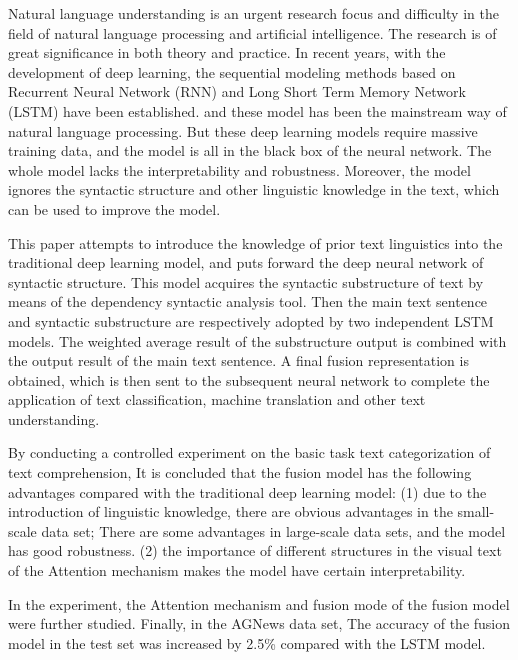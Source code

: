 \documentclass[bachelor,winfonts]{jnuthesis}
\begin{document}
\begin{englishabstract}
Natural language understanding is an urgent research focus and difficulty in the field of natural language processing and artificial intelligence.
The research is of great significance in both theory and practice.
In recent years, with the development of deep learning, the sequential modeling methods based on Recurrent Neural Network (RNN) and Long Short Term Memory Network (LSTM) have been established.
and these model has been the  mainstream way of natural language processing.
But these deep learning models require massive training data, and the model is all in the black box of the neural network.
The whole model lacks the interpretability and robustness.
Moreover, the model ignores the syntactic structure and other linguistic knowledge in the text, which can be used to improve the model.

This paper attempts to introduce the knowledge of prior text linguistics into the traditional deep learning model, and puts forward the deep neural network of syntactic structure.
This model acquires the syntactic substructure of text by means of the dependency syntactic analysis tool.
Then the main text sentence and syntactic substructure are respectively adopted by two independent LSTM models.
The weighted average result of the substructure output is combined with the output result of the main text sentence.
A final fusion representation is obtained, which is then sent to the subsequent neural network to complete the application of text classification, machine translation and other text understanding.

By conducting a controlled experiment on the basic task text categorization of text comprehension,
It is concluded that the fusion model has the following advantages compared with the traditional deep learning model:
(1) due to the introduction of linguistic knowledge, there are obvious advantages in the small-scale data set; There are some advantages in large-scale data sets, and the model has good robustness.
(2) the importance of different structures in the visual text of the Attention mechanism makes the model have certain interpretability.

In the experiment, the Attention mechanism and fusion mode of the fusion model were further studied. Finally, in the AGNews data set,
The accuracy of the fusion model in the test set was increased by 2.5\% compared with the LSTM model.
\end{englishabstract}
\end{document}

